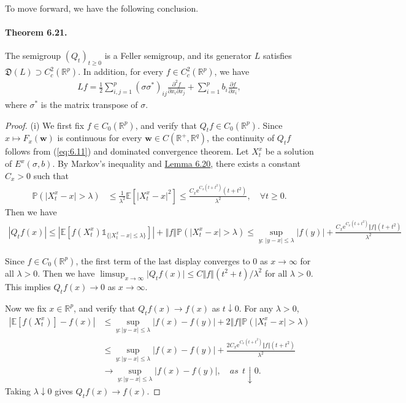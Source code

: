 \documentclass{article}
\numberwithin{equation}{section}
\newcommand{\e}{\mathrm{e}}
\newcommand{\E}{\mathbb{E}}
\newcommand{\bfw}{\mathbf{w}}
\renewcommand{\P}{\mathbb{P}}
\theoremstyle{plain}
\theoremstyle{definition}
\begin{document}
To move forward, we have the following conclusion.
\paragraph{Theorem 6.21.\label{thm:6.21}} The semigroup $(Q_t)_{t\geq 0}$ is a Feller semigroup, and its generator $L$ satisfies $\mathfrak{D}(L)\supset C_c^2(\mathbb{R}^p)$. In addition, for every $f\in C_c^2(\mathbb{R}^p)$, we have
\begin{align*}
	Lf = \frac{1}{2}\sum_{i,j=1}^p (\sigma\sigma^*)_{ij}\frac{\partial^2 f}{\partial x_i\partial x_j} + \sum_{i=1}^pb_i\frac{\partial f}{\partial x_i},
\end{align*}
where $\sigma^*$ is the matrix transpose of $\sigma$.
\begin{proof}
(i) We first fix $f\in C_0(\mathbb{R}^p)$, and verify that $Q_t f\in C_0(\mathbb{R}^p)$. Since $x\mapsto F_x(\bfw)$ is continuous for every $\bfw\in C(\mathbb{R}^+,\mathbb{R}^q)$, the continuity of $Q_tf$ follows from (\ref{eq:6.11}) and dominated convergence theorem. Let $X_t^x$ be a solution of $E^x(\sigma,b)$. By Markov's inequality and \hyperref[lemma:6.20]{Lemma 6.20}, there exists a constant $C_x>0$ such that
\begin{align*}
	\P(\vert X_t^x-x\vert>\lambda)&\leq\frac{1}{\lambda^2}\E\left[\vert X_t^x-x\vert^2\right]\leq \frac{C_x\e^{C_x(t+t^2)}(t+t^2)}{\lambda^2},\quad\forall t\geq 0.
\end{align*}
Then we have
\begin{align*}
	\left\vert Q_tf(x)\right\vert \leq\left\vert\E\left[f(X_t^x)\mathds{1}_{\{\vert X_t^x-x\vert\leq\lambda\}}\right]\right\vert + \left\Vert f\right\Vert\P(\vert X_t^x-x\vert>\lambda) \leq \sup_{y:\,\vert y-x\vert\leq\lambda}\vert f(y)\vert + \frac{C_x\e^{C_x(t+t^2)}\left\Vert f\right\Vert(t+t^2)}{\lambda^2}
\end{align*}

Since $f\in C_0(\mathbb{R}^p)$, the first term of the last display converges to $0$ as $x\to\infty$ for all $\lambda > 0$. Then we have $\limsup_{x\to\infty}\vert Q_t f(x)\vert\leq C\left\Vert f\right\Vert(t^2+t)/\lambda^2$ for all $\lambda>0$. This implies $Q_tf(x)\to 0$ as $x\to\infty$.

Now we fix $x\in\mathbb{R}^p$, and verify that $Q_tf(x)\to f(x)$ as $t\downarrow 0$. For any $\lambda>0$,
\begin{align*}
	\left\vert\E\left[f(X_t^x)\right] - f(x)\right\vert&\leq\sup_{y:\vert y-x\vert\leq\lambda}\vert f(x)-f(y)\vert + 2\left\Vert f\right\Vert\P\left(\vert X_t^x-x\vert > \lambda\right)\\
	&\leq \sup_{y:\vert y-x\vert\leq\lambda}\vert f(x)-f(y)\vert + \frac{2C_x\e^{C_x(t+t^2)}\Vert f\Vert(t+t^2)}{\lambda^2}\\ 
	&\to \sup_{y:\vert y-x\vert\leq\lambda}\vert f(x)-f(y)\vert,\quad as\ \ t\downarrow 0.
\end{align*}
Taking $\lambda\downarrow 0$ gives $Q_tf(x)\to f(x)$.\vspace{0.1cm}


\end{proof}
\end{document}
